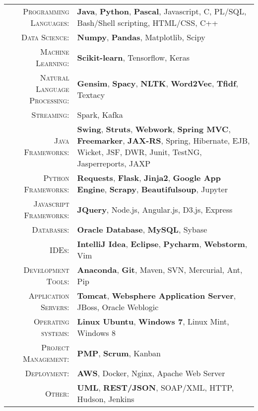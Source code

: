 %
%
%

\renewcommand{\arraystretch}{1.1}
	\begin{tabular}{>{}r>{}p{13cm}} 
		\textsc{Programming Languages:}  		&   \textbf{Java}, \textbf{Python}, \textbf{Pascal},  Javascript, C, PL/SQL, Bash/Shell scripting, HTML/CSS, C++\\ 
		\textsc{Data Science:}                  &   \textbf{Numpy}, \textbf{Pandas}, Matplotlib, Scipy\\
		\textsc{Machine Learning:}				 &  \textbf{Scikit-learn}, Tensorflow, Keras\\
		\textsc{Natural Language Processing:} 	 & \textbf{Gensim}, \textbf{Spacy}, \textbf{NLTK}, \textbf{Word2Vec}, \textbf{Tfidf}, Textacy\\
		\textsc{Streaming:}                  	&   Spark, Kafka\\
		\textsc{Java Frameworks:} 				& \textbf{Swing}, \textbf{Struts}, \textbf{Webwork}, \textbf{Spring MVC}, \textbf{Freemarker}, \textbf{JAX-RS}, Spring, Hibernate, EJB, Wicket, JSF, DWR, Junit, TestNG, Jasperreports, JAXP \\
		\textsc{Python Frameworks:} 				& \textbf{Requests}, \textbf{Flask}, \textbf{Jinja2}, \textbf{Google App Engine}, \textbf{Scrapy}, \textbf{Beautifulsoup}, Jupyter\\ 
		\textsc{Javascript Frameworks:} 				& \textbf{JQuery}, Node.js, Angular.js, D3.js, Express \\
		\textsc{Databases:}                  &   \textbf{Oracle Database}, \textbf{MySQL}, Sybase \\ 
		\textsc{IDEs:}	  		&   \textbf{IntelliJ Idea}, \textbf{Eclipse}, \textbf{Pycharm}, \textbf{Webstorm}, Vim  \\ 
		\textsc{Development Tools:} & 	  		\textbf{Anaconda}, \textbf{Git}, Maven, SVN, Mercurial, Ant, Pip \\
		\textsc{Application Servers:}				        &   \textbf{Tomcat}, \textbf{Websphere Application Server}, JBoss, Oracle Weblogic \\ 
		\textsc{Operating systems:}	        &   \textbf{Linux Ubuntu}, \textbf{Windows 7}, Linux Mint, Windows 8\\ 
		\textsc{Project Management:}				        &   \textbf{PMP}, \textbf{Scrum}, Kanban \\
		\textsc{Deployment:}				        &   \textbf{AWS}, Docker, Nginx, Apache Web Server\\
		\textsc{Other:}					        &   \textbf{UML}, \textbf{REST/JSON}, SOAP/XML, HTTP, Hudson, Jenkins \\
	\end{tabular}